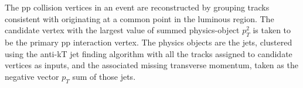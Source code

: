 The pp collision vertices in an event are reconstructed by grouping tracks consistent with originating at a common point in the luminous region.
The candidate vertex with the largest value of summed physics-object $p^2_T$ is taken to be the primary pp interaction vertex.
The physics objects are the jets, clustered using the anti-kT jet finding algorithm \cite{Cacciari:2008gp, Cacciari:2011ma} with all the tracks assigned to candidate vertices as inputs,
and the associated missing transverse momentum, taken as the negative vector $p_T$ sum of those jets.
